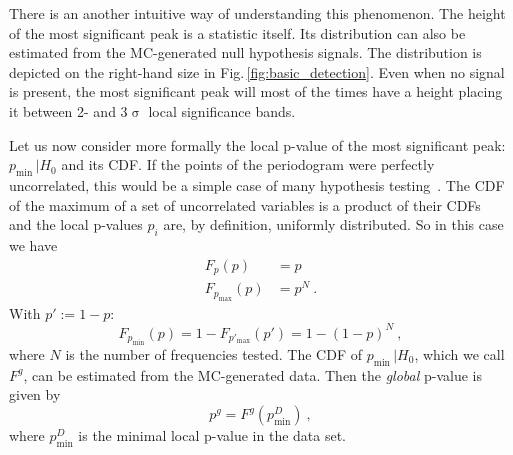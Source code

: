 There is an another intuitive way of understanding this phenomenon.
The height of the most significant peak is a statistic itself.
Its distribution can also be estimated from the MC-generated null hypothesis signals.
The distribution is depicted on the right-hand size in Fig.\,\ref{fig:basic_detection}.
Even when no signal is present, the most significant peak will most of the times have a height placing it between 2- and 3$\upsigma$ local significance bands.

Let us now consider more formally the local p-value of the most significant peak: $p_\text{min} \, | H_0$ and its CDF\@.
If the points of the periodogram were perfectly uncorrelated, this would be a simple case of many hypothesis testing~\cite{Algeri2016}.
The CDF of the maximum of a set of uncorrelated variables is a product of their CDFs~\cite{Papoulis2002} and the local p-values $p_i$ are, by definition, uniformly distributed.
So in this case we have
\begin{align}\label{eq:Fpmin}
  F_p(p) &= p \\
  F_{p_\text{max}}(p) &= p^N \ .
\end{align}
With $p' := 1 - p$:
\begin{equation}
  F_{p_\text{min}}(p) = 1 - F_{p'_\text{max}}(p') = 1 - {(1 - p)}^N \ ,
  \label{eq:global_CDF_functional_form}
\end{equation}
where $N$ is the number of frequencies tested.
The CDF of $p_\text{min} \, | H_0$, which we call $F^g$, can be estimated from the MC-generated data.
Then the \emph{global} p-value is given by
\begin{equation}
  p^g = F^g(p_\text{min}^D) \ ,
\end{equation}
where $p_\text{min}^D$ is the minimal local p-value in the data set.

